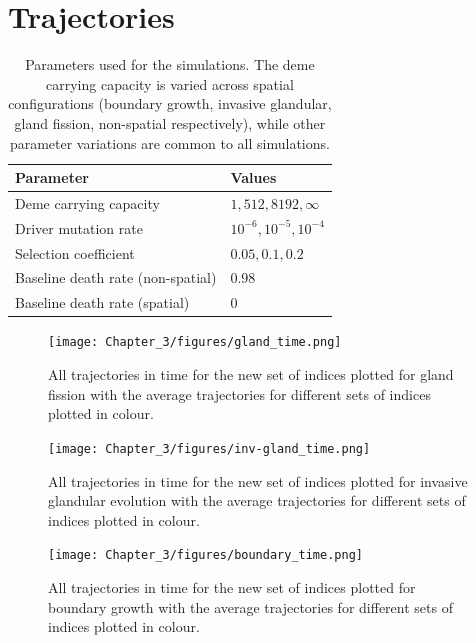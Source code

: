 \chapter{Trajectories}\label{app:trajs}

\begin{table}[h]
\centering
\begin{tabularx}{0.75\textwidth}{|X|X|}
\hline
Parameter & Values \\
\hline
    Deme carrying capacity & $1, 512, 8192, \infty$ \\
    Driver mutation rate & $10^{-6}, 10^{-5}, 10^{-4}$ \\
    Selection coefficient & $0.05, 0.1, 0.2$ \\
    Baseline death rate (non-spatial) & $0.98$ \\
    Baseline death rate (spatial) & $0$ \\
\hline
\end{tabularx}
\caption{Parameters used for the simulations. The deme carrying capacity is
    varied across spatial configurations (boundary growth, invasive glandular,
    gland fission, non-spatial respectively), while other parameter variations
    are common to all simulations.}
\label{tab:traj_params}
\end{table}

\begin{figure}[h]
\centering
\texttt{[image: Chapter\_3/figures/gland\_time.png]}
\caption{All trajectories in time for the new set of indices plotted for gland
    fission with the average trajectories for different sets of indices plotted
    in colour.}
\label{fig:gland_time}
\end{figure}

\begin{figure}[h]
\centering
\texttt{[image: Chapter\_3/figures/inv-gland\_time.png]}
\caption{All trajectories in time for the new set of indices plotted for
    invasive glandular evolution with the average trajectories for different
    sets of indices plotted in colour.}
\label{fig:inv-gland_time}
\end{figure}

\begin{figure}[h]
\centering
\texttt{[image: Chapter\_3/figures/boundary\_time.png]}
\caption{All trajectories in time for the new set of indices plotted for
    boundary growth with the average trajectories for different
    sets of indices plotted in colour.}
\label{fig:boundary_time}
\end{figure}

